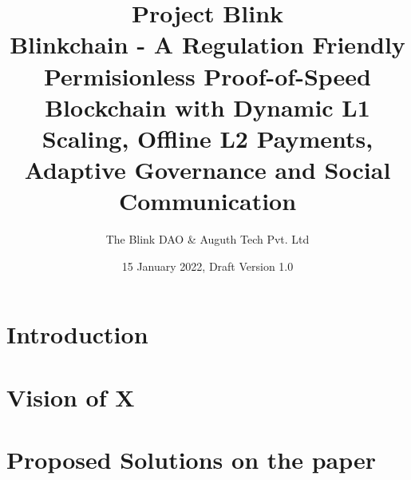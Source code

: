 \documentclass[letterpaper,11pt]{article}
\title{\textbf{Project Blink}\\
\vspace{3mm}
Blinkchain - A Regulation Friendly Permisionless Proof-of-Speed Blockchain with Dynamic L1 Scaling, Offline L2 Payments, Adaptive Governance and Social Communication}
\date{15 January 2022, Draft Version 1.0}
\author[1]{The Blink DAO \& Auguth Tech Pvt. Ltd}
\begin{document}
\maketitle

\begin{abstract}

\lipsum[1]

\end{abstract}


\section{\textbf{Introduction}}

\section{\textbf{Vision of X}}

\section{\textbf{Proposed Solutions on the paper}}
\end{document}
